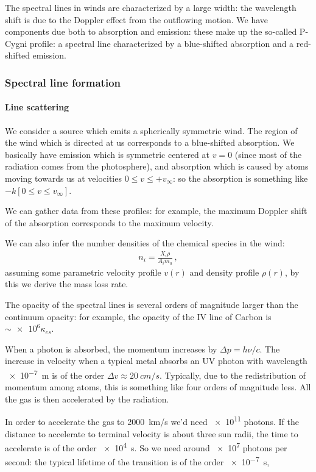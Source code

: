 \documentclass[main.tex]{subfiles}
\begin{document}
The spectral lines in winds are characterized by a large width: the wavelength shift is due to the Doppler effect from the outflowing motion.
We have components due both to absorption and emission: these make up the so-called P-Cygni profile: a spectral line characterized  by a blue-shifted absorption and a red-shifted emission.

\subsubsection{Spectral line formation}

\paragraph{Line scattering}


We consider a source which emits a spherically symmetric wind.
The region of the wind which is directed at us corresponds to a blue-shifted absorption.
We basically have emission which is symmetric centered at \(v=0\) (since most of the radiation comes from the photosphere), and absorption which is caused by atoms moving towards us at velocities \(0 \leq v \leq + v_\infty\): so the absorption is something like \(- k [0 \leq v \leq v_\infty]\).

We can gather data from these profiles: for example, the maximum Doppler shift of the absorption corresponds to the maximum velocity.

We can also infer the number densities of the chemical species in the wind: 
%
\begin{align}
  n_i  = \frac{X_i \rho }{A_i m_u}
\,,
\end{align}
%
assuming some parametric velocity profile \(v(r)\) and density profile \(\rho (r)\), by this we derive the mass loss rate.

The opacity of the spectral lines is several orders of magnitude larger than the continuum opacity: for example, the opacity of the IV line of Carbon is \(\sim \num{e6} \kappa_{es}\).

When a photon is absorbed, the momentum increases by \(\Delta p = h \nu / c \). 
The increase in velocity when a typical metal absorbs an UV photon with wavelength \SI{e-7}{m} is of the order \(\Delta v \approx \SI{20}{cm/s}\). Typically, due to the redistribution of momentum among atoms, this is something like four orders of magnitude less.
All the gas is then accelerated by the radiation.

In order to accelerate the gas to \SI{2000}{km/s} we'd need \num{e11} photons.
If the distance to accelerate to terminal velocity is about three sun radii, the time to accelerate is of the order \SI{e4}{s}.
So we need around \num{e7} photons per second: the typical lifetime of the transition is of the order \SI{e-7}{s}, 
\end{document}
